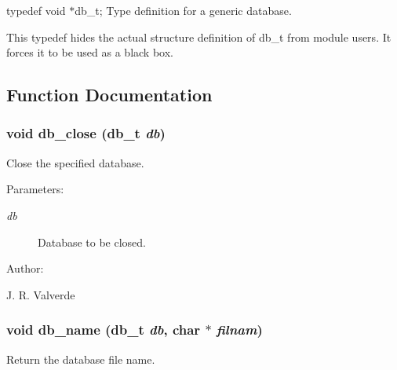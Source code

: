 typedef void $\ast$db\_\-t; Type definition for a generic database.



 This typedef hides the actual structure definition of db\_\-t from  module users. It forces it to be used as a black box. 

\subsection{Function Documentation}
\subsubsection{\setlength{\rightskip}{0pt plus 5cm}void db\_\-close ({\bf db\_\-t} {\em db})}\label{P__db_8h_a5}


Close the specified database.



 \begin{Desc}
\item[Parameters: ]\par
\begin{description}
\item[{\em 
db}]Database to be closed.\end{description}
\end{Desc}
\begin{Desc}
\item[Author: ]\par
J. R. Valverde \end{Desc}
\subsubsection{\setlength{\rightskip}{0pt plus 5cm}void db\_\-name ({\bf db\_\-t} {\em db}, char $\ast$ {\em filnam})}\label{P__db_8h_a4}


Return the database file name.



